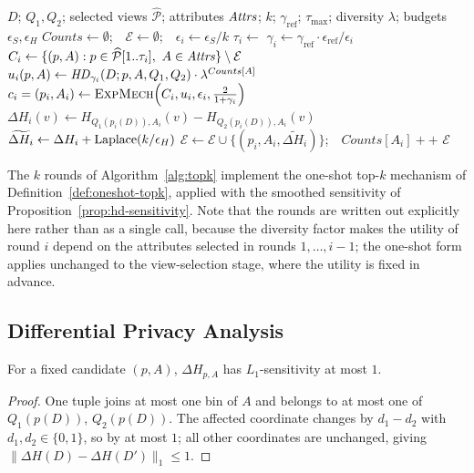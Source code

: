 \begin{algorithm}[t]
\caption{Find-Top-$k$-Explanations}
\label{alg:topk}
\begin{algorithmic}[1]
\Require $D$; $Q_1,Q_2$; selected views $\widehat{\mathcal{P}}$; attributes $\mathit{Attrs}$; $k$; $\gamma_{\text{ref}}$; $\tau_{\max}$; diversity $\lambda$; budgets $\epsilon_S,\epsilon_H$
\State $Counts\gets\emptyset$;\ \ $\mathcal{E}\gets\emptyset$;\ \ $\epsilon_i \gets \epsilon_S/k$
  \State $\tau_i \gets$  
  \State $\gamma_i \gets \gamma_{\text{ref}}\cdot \epsilon_{\text{ref}}/\epsilon_i$ 
  \State $C_i \gets \{(p,A): p\in\widehat{\mathcal{P}}[1..\tau_i],\ A\in \mathit{Attrs}\}\setminus \mathcal{E}$
  \State $u_i(p,A)\gets \mathit{HD}_{\gamma_i}(D;p,A,Q_1,Q_2)\cdot \lambda^{Counts[A]}$
  \State $c_i=(p_i,A_i)\gets \textsc{ExpMech}\!\left(C_i,u_i,\epsilon_i,\tfrac{2}{1+\gamma_i}\right)$
  \State $\Delta H_i(v)\gets H_{Q_1(p_i(D)),A_i}(v)-H_{Q_2(p_i(D)),A_i}(v)$
  \State $\widetilde{\Delta H_i}\gets \Delta H_i+\operatorname{Laplace}(k/\epsilon_H)$
  \State $\mathcal{E}\gets\mathcal{E}\cup\{(p_i,A_i,\widetilde{\Delta H_i})\}$;\ \ $Counts[A_i]{+}{+}$
\EndFor
\State \Return $\mathcal{E}$
\end{algorithmic}
\end{algorithm}

The $k$ rounds of Algorithm~\ref{alg:topk} implement the one-shot top-$k$ mechanism of Definition~\ref{def:oneshot-topk}, applied with the smoothed sensitivity of Proposition~\ref{prop:hd-sensitivity}.
Note that the rounds are written out explicitly here rather than as a single call, because the diversity factor makes the utility of round $i$ depend on the attributes selected in rounds $1,\dots,i-1$; the one-shot form applies unchanged to the view-selection stage, where the utility is fixed in advance.

\subsection{Differential Privacy Analysis}
\label{subsec:dp-proof}

\begin{proposition}
\label{prop:histogram-release-sensitivity}
For a fixed candidate $(p,A)$, $\Delta H_{p,A}$ has $L_1$-sensitivity at most $1$.
\end{proposition}

\begin{proof}
One tuple joins at most one bin of $A$ and belongs to at most one of $Q_1(p(D))$, $Q_2(p(D))$.
The affected coordinate changes by $d_1-d_2$ with $d_1,d_2\in\{0,1\}$, so by at most $1$; all other coordinates are unchanged, giving $\|\Delta H(D)-\Delta H(D')\|_1\le 1$.
\end{proof}

